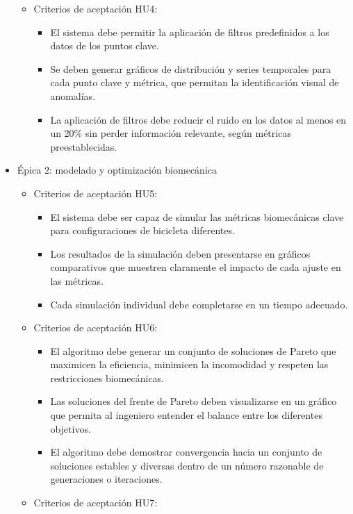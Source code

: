\documentclass[
11pt, %
]{charter}
\begin{document}
\begin{itemize}
\begin{itemize}
\begin{itemize}
        \end{itemize}
      \item Criterios de aceptación HU4:
        \begin{itemize}
          \item El sistema debe permitir la aplicación de filtros predefinidos a los datos de los puntos clave.
          \item Se deben generar gráficos de distribución y series temporales para cada punto clave y métrica, que permitan la identificación visual de anomalías.
          \item La aplicación de filtros debe reducir el ruido en los datos al menos en un 20\% sin perder información relevante, según métricas preestablecidas.
        \end{itemize}
    \end{itemize}
  \item Épica 2: modelado y optimización biomecánica
    \begin{itemize}
      \item Criterios de aceptación HU5:
        \begin{itemize}
          \item El sistema debe ser capaz de simular las métricas biomecánicas clave para configuraciones de bicicleta diferentes.
          \item Los resultados de la simulación deben presentarse en gráficos comparativos que muestren claramente el impacto de cada ajuste en las métricas.
          \item Cada simulación individual debe completarse en un tiempo adecuado.
        \end{itemize}
      \item Criterios de aceptación HU6:
        \begin{itemize}
          \item El algoritmo debe generar un conjunto de soluciones de Pareto que maximicen la eficiencia, minimicen la incomodidad y respeten las restricciones biomecánicas.
          \item Las soluciones del frente de Pareto deben visualizarse en un gráfico que permita al ingeniero entender el balance entre los diferentes objetivos.
          \item El algoritmo debe demostrar convergencia hacia un conjunto de soluciones estables y diversas dentro de un número razonable de generaciones o iteraciones.
        \end{itemize}
      \item Criterios de aceptación HU7:

\end{itemize}
\end{itemize}
\end{document}

